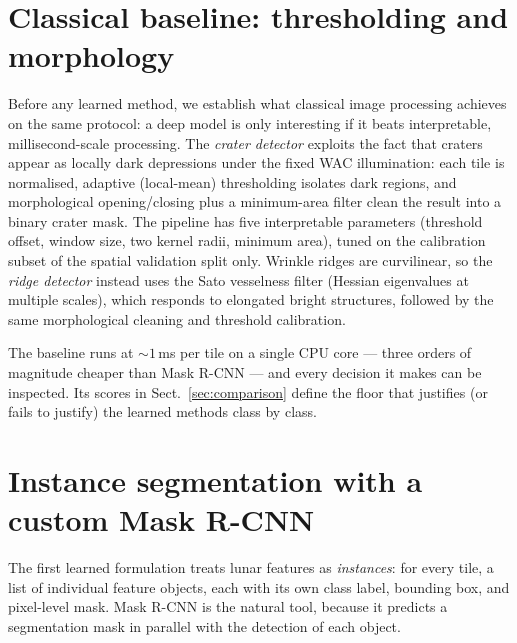 \documentclass{aa}
\begin{document}
\section{Classical baseline: thresholding and morphology}
\label{sec:classical}

Before any learned method, we establish what classical image processing achieves on the same protocol: a deep model is only interesting if it beats interpretable, millisecond-scale processing. The \emph{crater detector} exploits the fact that craters appear as locally dark depressions under the fixed WAC illumination: each tile is normalised, adaptive (local-mean) thresholding isolates dark regions, and morphological opening/closing plus a minimum-area filter clean the result into a binary crater mask. The pipeline has five interpretable parameters (threshold offset, window size, two kernel radii, minimum area), tuned on the calibration subset of the spatial validation split only. Wrinkle ridges are curvilinear, so the \emph{ridge detector} instead uses the Sato vesselness filter (Hessian eigenvalues at multiple scales), which responds to elongated bright structures, followed by the same morphological cleaning and threshold calibration.

The baseline runs at ${\sim}1$\,ms per tile on a single CPU core --- three orders of magnitude cheaper than Mask R-CNN --- and every decision it makes can be inspected. Its scores in Sect.~\ref{sec:comparison} define the floor that justifies (or fails to justify) the learned methods class by class.


\section{Instance segmentation with a custom Mask R-CNN}
\label{sec:maskrcnn}

The first learned formulation treats lunar features as \emph{instances}: for every tile, a list of individual feature objects, each with its own class label, bounding box, and pixel-level mask. Mask R-CNN \citep{he2017maskrcnn} is the natural tool, because it predicts a segmentation mask in parallel with the detection of each object.
\end{document}
